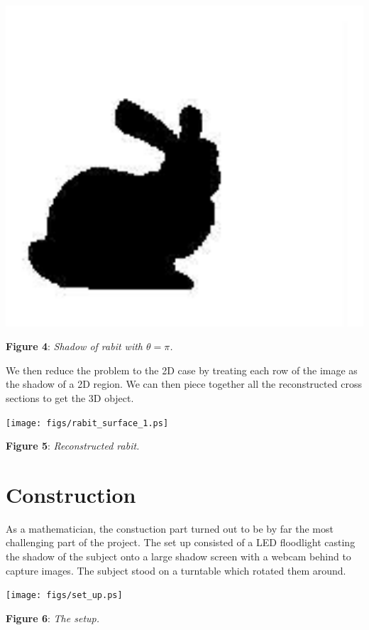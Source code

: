 \documentclass[noback]{cuposter}
\begin{document}
\vspace*{-1cm}
{
\centerline{\includegraphics[width=22cm]
  {figs/1.ps}}
}
\vspace*{-1cm} \textbf{Figure 4}: \textit{Shadow of rabit with $\theta=\pi$.}

We then reduce the problem to the 2D case by treating each row of the image as the shadow of a 2D region.
We can then piece together all the reconstructed cross sections to get the 3D object.

\vspace*{2cm}
{
\centerline{\texttt{[image: figs/rabit\_surface\_1.ps]}}
}
\vspace*{5mm} \textbf{Figure 5}: \textit{Reconstructed rabit.}

\vspace*{-10mm} 

\section{Construction}
As a mathematician, the constuction part turned out to be by far the most challenging part of the project.
The set up consisted of a LED floodlight casting the shadow of the subject onto a large shadow screen with a webcam behind to capture images.
The subject stood on a turntable which rotated them around.

\vspace*{2cm}
{
\centerline{\texttt{[image: figs/set\_up.ps]}}
}
\vspace*{5mm} \textbf{Figure 6}: \textit{The setup.}
\end{document}
